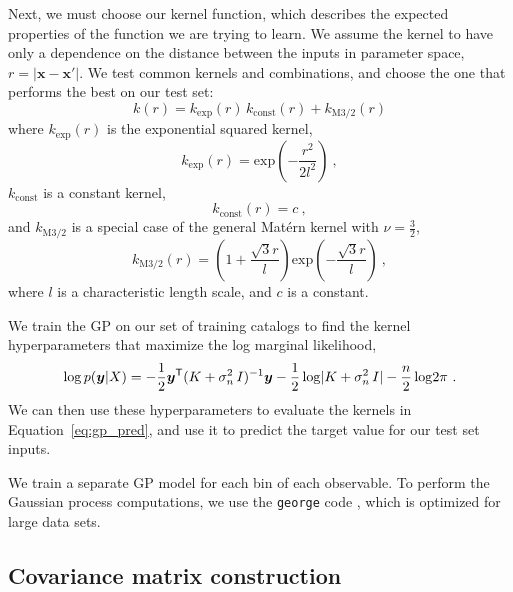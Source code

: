 Next, we must choose our kernel function, which describes the expected properties of the function we are trying to learn.
We assume the kernel to have only a dependence on the distance between the inputs in parameter space, $r = |\bm{x} - \bm{x'}|$. 
We test common kernels and combinations, and choose the one that performs the best on our test set:
\begin{equation}
    k(r) = k_\mathrm{exp}(r)\,k_\mathrm{const}(r) + k_\mathrm{M3/2}(r)
\end{equation}
where $k_\mathrm{exp}(r)$ is the exponential squared kernel,
\begin{equation}
    k_\mathrm{exp}(r) = \mathrm{exp}\left( -\frac{r^2}{2l^2} \right) ~,
\end{equation}
$k_\mathrm{const}$ is a constant kernel,
\begin{equation}
    k_\mathrm{const}(r) = c ~,
\end{equation}
and $k_\mathrm{M3/2}$ is a special case of the general Mat\'ern kernel with $\nu=\frac{3}{2}$,
\begin{equation}
    k_\mathrm{M3/2}(r) = \left( 1 + \frac{\sqrt{3}r}{l} \right) \mathrm{exp}  \left( -\frac{\sqrt{3}r}{l} \right) ~,
\end{equation}
where $l$ is a characteristic length scale, and $c$ is a constant.

We train the GP on our set of training catalogs to find the kernel hyperparameters that maximize the log marginal likelihood,
\begin{equation}
    \mathrm{log}\,p(\bm{y}|X) = -\frac{1}{2} \bm{y}^{\mathsf{T}} (K + \sigma_n^2\,I)^{-1}\bm{y}
    - \frac{1}{2} \, \mathrm{log}|K + \sigma_n^2\,I| - \frac{n}{2} \, \mathrm{log}2\pi ~.
\end{equation} 
We can then use these hyperparameters to evaluate the kernels in Equation~\eqref{eq:gp_pred}, and use it to predict the target value for our test set inputs.

We train a separate GP model for each bin of each observable.
To perform the Gaussian process computations, we use the \texttt{george} code \citep{Ambikasaran2016}, which is optimized for large data sets.


\subsection{Covariance matrix construction}
\label{sec:cov}

